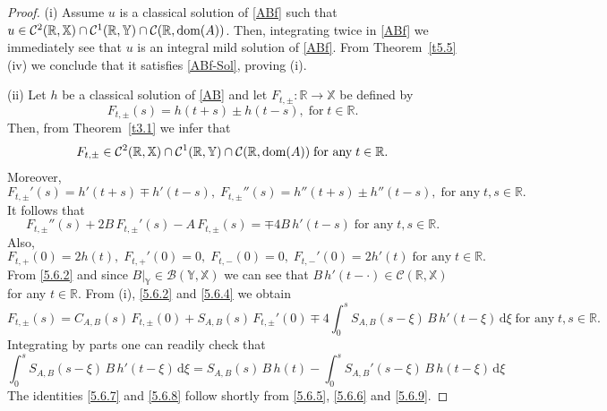 \documentclass[11pt]{amsart}
\numberwithin{equation}{section}
\newcommand{\rmd}{{\mathrm{d}}}
\theoremstyle{remark}
\theoremstyle{definition}
\newcommand\bX{{\mathbb X}}
\newcommand\bY{{\mathbb Y}}
\newcommand{\dom}{\text{\rm{dom}}}
\begin{document}
\begin{proof}(i) Assume $u$ is a classical solution of \eqref{ABf} such that $u\in\mathcal{C}^2(\mathbb{R}, \bX) \cap \mathcal{C}^1(\mathbb{R}, \bY) \cap \mathcal{C}(\mathbb{R}, \dom(A))$. Then, integrating twice in \eqref{ABf} we immediately see that $u$ is an integral mild solution of \eqref{ABf}. From Theorem~\ref{t5.5}(iv) we conclude that it satisfies \eqref{ABf-Sol}, proving (i).
	
	(ii) Let $h$ be a classical solution of \eqref{AB} and let $F_{t,\pm}: \mathbb{R} \to\bX$ be defined by
	\begin{equation}\label{5.6.1}
		F_{t,\pm}(s) = h(t+s) \pm h(t-s), \;\mbox{for}\; t \in \mathbb{R}.
	\end{equation}
	Then, from Theorem~\ref{t3.1} we infer that
	\begin{equation}\label{5.6.2}
		F_{t,\pm} \in \mathcal{C}^2(\mathbb{R}, \bX) \cap \mathcal{C}^1(\mathbb{R}, \bY) \cap \mathcal{C}(\mathbb{R}, \dom(A))\;\mbox{for any}\; t \in \mathbb{R}.
	\end{equation}
	Moreover,
	\begin{equation}\label{5.6.3}
		F_{t,\pm}'(s) = h'(t+s) \mp h'(t-s), \; F_{t,\pm}''(s) = h''(t+s) \pm h''(t-s),\;\mbox{for any}\; t,s \in \mathbb{R}.
	\end{equation}
	It follows that
	\begin{equation}\label{5.6.4} 
		F_{t,\pm}''(s) + 2B\,F_{t,\pm}'(s) - A\,F_{t,\pm}(s) = \mp 4B\,h'(t-s)\;\mbox{for any}\; t,s \in \mathbb{R}.
	\end{equation}
	Also,
	\begin{equation}\label{5.6.5} 
		F_{t,+}(0) = 2h(t), \; F_{t,+}'(0) = 0, \; F_{t,-}(0) = 0, \; F_{t,-}'(0) = 2h'(t)\;\mbox{for any}\; t \in \mathbb{R}.
	\end{equation}
	From \eqref{5.6.2} and since $B|_\bY \in \mathcal{B}(\bY, \bX)$ we can see that $B\,h'(t-\cdot) \in \mathcal{C}(\mathbb{R}, \bX)$ for any $t \in \mathbb{R}$. From (i), \eqref{5.6.2} and \eqref{5.6.4} we obtain
	\begin{equation}\label{5.6.6} 
		F_{t,\pm}(s) = C_{A,B}(s)\,F_{t,\pm}(0) + S_{A,B}(s)\,F_{t,\pm}'(0) \mp 4\int_0^s S_{A,B}(s-\xi)\,B\,h'(t-\xi)\,\rmd\xi\;\mbox{for any}\; t,s \in \mathbb{R}.
	\end{equation}
	Integrating by parts one can readily check that
	\begin{equation}\label{5.6.9}
		\int_0^s S_{A,B}(s-\xi)\,B\,h'(t-\xi)\,\rmd\xi = S_{A,B}(s)\,B\,h(t) - \int_0^s S_{A,B}'(s-\xi)\,B\,h(t-\xi)\,\rmd\xi
	\end{equation}
	The identities \eqref{5.6.7} and \eqref{5.6.8} follow shortly from \eqref{5.6.5}, \eqref{5.6.6} and \eqref{5.6.9}.
\end{proof}
\end{document}
